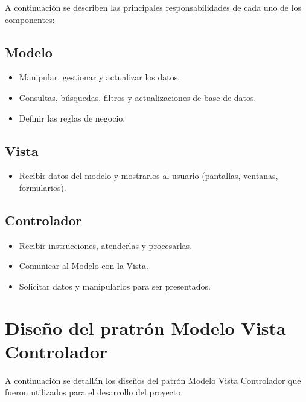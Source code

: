 \newpage
A continuación se describen las principales responsabilidades de cada uno de los componentes: 

\subsection{Modelo}
\begin{itemize}
	\item Manipular, gestionar y actualizar los datos\cite{mvc2}.
	
	\item Consultas, búsquedas, filtros y actualizaciones de base de datos\cite{mvc2}.
	
	\item Definir las reglas de negocio\cite{mvc2}.
	
\end{itemize}

\subsection{Vista}
\begin{itemize}
	\item Recibir datos del modelo y mostrarlos al usuario (pantallas, ventanas, formularios)\cite{mvc2}.
	
\end{itemize}

\subsection{Controlador}
\begin{itemize}
	\item Recibir instrucciones, atenderlas y procesarlas\cite{mvc2}.
	
	\item Comunicar al Modelo con la Vista\cite{mvc2}.
	
	\item Solicitar datos y manipularlos para ser presentados\cite{mvc2}.
\end{itemize}

\section{Diseño del pratrón Modelo Vista Controlador}

A continuación se detallán los diseños del patrón Modelo Vista Controlador que fueron utilizados para el desarrollo del proyecto. \\

